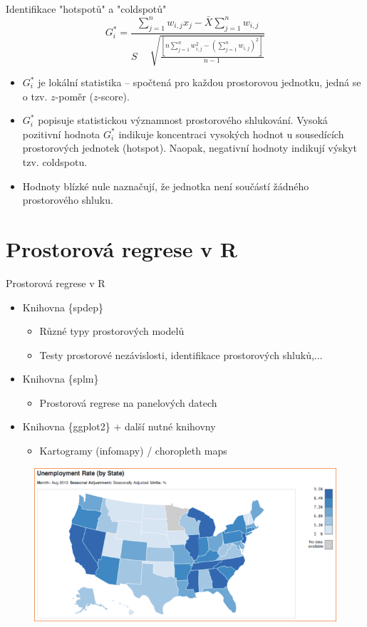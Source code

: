 \documentclass{beamer}
\begin{document}
\begin{frame}{Identifikace "hotspotů" a "coldspotů"}
	$$ G^\ast_i = \frac{\sum_{j=1}^n w_{i,j} x_j - \bar{X} \sum_{j=1}^n w_{i,j}}{S \quad \sqrt[]{\frac{[n\sum_{j=1}^n w^2_{i,j}-(\sum_{j=1}^n w_{i,j})^2]}{n-1}}}$$
\begin{itemize}
	\item $ G^\ast_i$ je lokální statistika – spočtená pro každou prostorovou jednotku, jedná se o tzv. $z$-poměr ($z$-score).
	\item $ G^\ast_i$ popisuje statistickou významnost prostorového shlukování. Vysoká pozitivní hodnota $G^\ast_i$ indikuje koncentraci vysokých hodnot u sousedících prostorových jednotek (hotspot). Naopak, negativní hodnoty indikují výskyt tzv. coldspotu.
	\item Hodnoty blízké nule naznačují, že jednotka není součástí žádného prostorového shluku.
	
\end{itemize}
\end{frame}
\section{Prostorová regrese v R}
\begin{frame}{Prostorová regrese v R}
\begin{itemize}
	\item Knihovna \{spdep\} 
	\begin{itemize}
		\item Různé typy prostorových modelů
		\item Testy prostorové nezávislosti, identifikace prostorových shluků,$\dots$
	\end{itemize}
	\item	Knihovna \{splm\}
	\begin{itemize}
		\item Prostorová regrese na panelových datech
	\end{itemize}
	\item Knihovna \{ggplot2\} + další nutné knihovny
	\begin{itemize}
		\item Kartogramy (infomapy) / choropleth maps
	\end{itemize}
\end{itemize}
 \begin{figure}
 	\includegraphics[width=.5\textwidth]{IMG/sp_unemp.PNG}
 \end{figure}

\end{frame}

\end{document}

